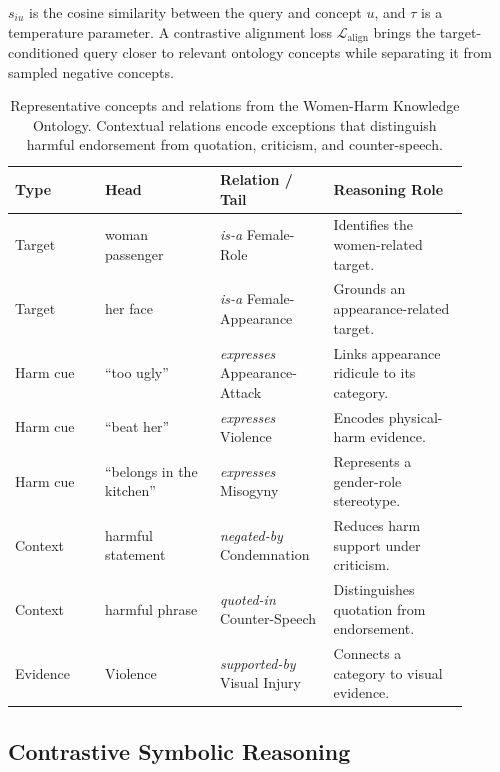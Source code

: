\documentclass[11pt]{article}
\begin{document}
$s_{iu}$ is the cosine similarity between the query and concept $u$,
and $\tau$ is a temperature parameter. A contrastive alignment loss
$\mathcal{L}_{\mathrm{align}}$ brings the target-conditioned query
closer to relevant ontology concepts while separating it from sampled
negative concepts. 
\begin{table}[t]
\centering
\small
\setlength{\tabcolsep}{3.5pt}
\renewcommand{\arraystretch}{1.08}
\begin{tabular}{p{0.18\linewidth}p{0.23\linewidth}
                p{0.22\linewidth}p{0.27\linewidth}}
\toprule
\textbf{Type} &
\textbf{Head} &
\textbf{Relation / Tail} &
\textbf{Reasoning Role} \\
\midrule

Target
& woman passenger
& \textit{is-a} Female-Role
& Identifies the women-related target. \\

Target
& her face
& \textit{is-a} Female-Appearance
& Grounds an appearance-related target. \\

Harm cue
& ``too ugly''
& \textit{expresses} Appearance-Attack
& Links appearance ridicule to its category. \\

Harm cue
& ``beat her''
& \textit{expresses} Violence
& Encodes physical-harm evidence. \\

Harm cue
& ``belongs in the kitchen''
& \textit{expresses} Misogyny
& Represents a gender-role stereotype. \\

Context
& harmful statement
& \textit{negated-by} Condemnation
& Reduces harm support under criticism. \\

Context
& harmful phrase
& \textit{quoted-in} Counter-Speech
& Distinguishes quotation from endorsement. \\

Evidence
& Violence
& \textit{supported-by} Visual Injury
& Connects a category to visual evidence. \\

\bottomrule
\end{tabular}
\caption{Representative concepts and relations from the Women-Harm
Knowledge Ontology. Contextual relations encode exceptions that
distinguish harmful endorsement from quotation, criticism, and
counter-speech.}
\label{tab:ontology_examples}
\end{table}
\subsection{Contrastive Symbolic Reasoning}
\label{subsec:contrastive-rules}
\end{document}
